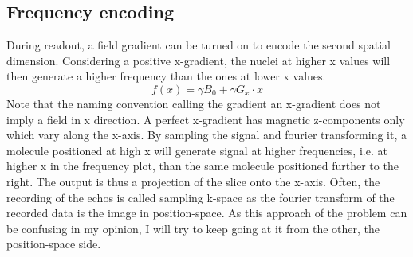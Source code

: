         \subsection{Frequency encoding}
            During readout, a field gradient can be turned on to encode the second spatial dimension. Considering a positive x-gradient, the nuclei at higher x values will then generate a higher frequency than the ones at lower x values.
            \begin{equation}
                f(x) = \gamma B_0 + \gamma G_x \cdot x
            \end{equation}
            Note that the naming convention calling the gradient an x-gradient does not imply a field in x direction. A perfect x-gradient has magnetic z-components only which vary along the x-axis. By sampling the signal and fourier transforming it, a molecule positioned at high x will generate signal at higher frequencies, i.e. at higher x in the frequency plot, than the same molecule positioned further to the right. The output is thus a projection of the slice onto the x-axis.
            Often, the recording of the echos is called sampling k-space as the fourier transform of the recorded data is the image in position-space. As this approach of the problem can be confusing in my opinion, I will try to keep going at it from the other, the position-space side.
